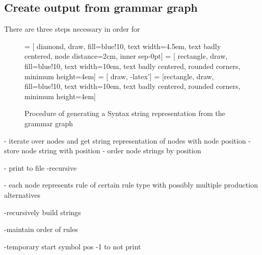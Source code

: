 \subsection{Create output from grammar graph}\label{sec:ConceptOutputGrammarGraph}
There are three steps necessary in order for 
\begin{figure}[H]
 = [ diamond, draw, fill=blue!10, text width=4.5em, text badly centered, node distance=2cm, inner sep-0pt]  
 = [ rectangle, draw, fill=blue!10, text width=10em, text badly centered, rounded corners, minimum height=4em]  
 = [ draw, -latex']  
 = [rectangle, draw, fill=blue!10, text width=10em, text badly centered, rounded corners, minimum height=4em]  
\begin{center}
\end{center}
\caption{Procedure of generating a Syntax string representation from the grammar graph}
\label{fig:ConceptOutputGrammarGraphProcedure}
\end{figure}
- iterate over nodes and get string representation of nodes with node position
- store node string with position
- order node strings by position


- print to file
-recursive

- each node represents rule of certain rule type with possibly multiple production alternatives

-recursively build strings

-maintain order of rules

-temporary start symbol pos -1 to not print


